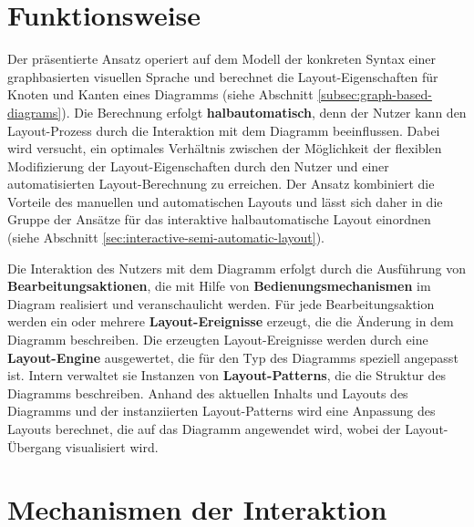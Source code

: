 \begin{enumerate}[label={K.\arabic*}]
\end{enumerate}


\section{Funktionsweise}
\label{sec:functionality}

Der präsentierte Ansatz operiert auf dem Modell der konkreten Syntax einer graphbasierten visuellen Sprache und berechnet die Layout-Eigenschaften für Knoten und Kanten eines Diagramms (siehe Abschnitt \ref{subsec:graph-based-diagrams}). Die Berechnung erfolgt \textbf{halbautomatisch}, denn der Nutzer kann den Layout-Prozess durch die Interaktion mit dem Diagramm beeinflussen. Dabei wird versucht, ein optimales Verhältnis zwischen der Möglichkeit der flexiblen Modifizierung der Layout-Eigenschaften durch den Nutzer und einer automatisierten Layout-Berechnung zu erreichen. Der Ansatz kombiniert die Vorteile des manuellen und automatischen Layouts und lässt sich daher in die Gruppe der Ansätze für das interaktive halbautomatische Layout einordnen (siehe Abschnitt \ref{sec:interactive-semi-automatic-layout}).

Die Interaktion des Nutzers mit dem Diagramm erfolgt durch die Ausführung von \textbf{Bearbeitungsaktionen}, die mit Hilfe von \textbf{Bedienungsmechanismen} im Diagram realisiert und veranschaulicht werden. Für jede Bearbeitungsaktion werden ein oder mehrere \textbf{Layout-Ereignisse} erzeugt, die die Änderung in dem Diagramm beschreiben. Die erzeugten Layout-Ereignisse werden durch eine \textbf{Layout-Engine} ausgewertet, die für den Typ des Diagramms speziell angepasst ist. Intern verwaltet sie Instanzen von \textbf{Layout-Patterns}, die die Struktur des Diagramms beschreiben. Anhand des aktuellen Inhalts und Layouts des Diagramms und der instanziierten Layout-Patterns wird eine Anpassung des Layouts berechnet, die auf das Diagramm angewendet wird, wobei der Layout-Übergang visualisiert wird.


\section{Mechanismen der Interaktion}
\label{sec:interaction-mechanisms}

